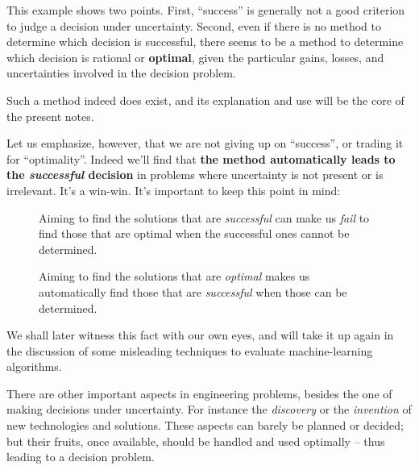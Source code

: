 \documentclass[
  a4paper,
  DIV=11,
  numbers=noendperiod,
  oneside]{scrreprt}
\begin{document}
This example shows two points. First, ``success'' is generally not a
good criterion to judge a decision under uncertainty. Second, even if
there is no method to determine which decision is successful, there
seems to be a method to determine which decision is rational or
{\textbf{optimal}}, given the particular gains, losses, and
uncertainties involved in the decision problem.

Such a method indeed does exist, and its explanation and use will be the
core of the present notes.

Let us emphasize, however, that we are not giving up on ``success'', or
trading it for ``optimality''. Indeed we'll find that \textbf{the method
automatically leads to the \emph{successful} decision} in problems where
uncertainty is not present or is irrelevant. It's a win-win. It's
important to keep this point in mind:

\begin{figure}

\begin{tcolorbox}[enhanced jigsaw, bottomrule=.15mm, leftrule=.75mm, opacitybacktitle=0.6, breakable, toptitle=1mm, coltitle=black, title={}, rightrule=.15mm, left=2mm, colframe=quarto-callout-note-color-frame, bottomtitle=1mm, arc=.35mm, titlerule=0mm, toprule=.15mm, opacityback=0, colback=white, colbacktitle=quarto-callout-note-color!10!white]

{Aiming to find the solutions that are \emph{successful} can make us
\emph{fail} to find those that are optimal when the successful ones
cannot be determined.}

{Aiming to find the solutions that are \emph{optimal} makes us
automatically find those that are \emph{successful} when those can be
determined.}

\end{tcolorbox}

\end{figure}

We shall later witness this fact with our own eyes, and will take it up
again in the discussion of some misleading techniques to evaluate
machine-learning algorithms.

\hfill\break

There are other important aspects in engineering problems, besides the
one of making decisions under uncertainty. For instance the
\emph{discovery} or the \emph{invention} of new technologies and
solutions. These aspects can barely be planned or decided; but their
fruits, once available, should be handled and used optimally -- thus
leading to a decision problem.
\end{document}
